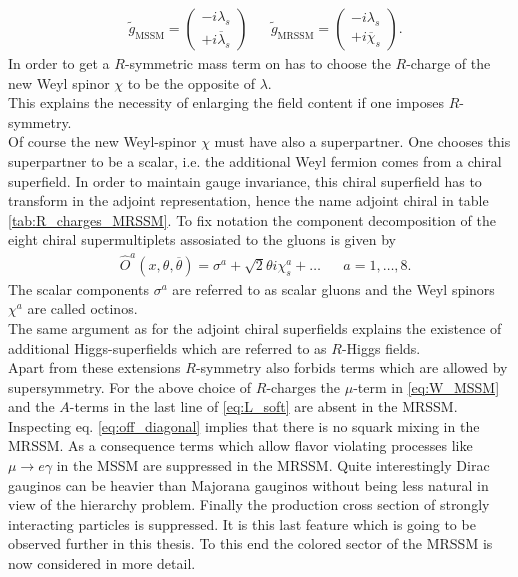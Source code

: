 \begin{align}
& \tilde{g}_\mathrm{MSSM} = \begin{pmatrix}
-i \lambda_s \\
+i \overline{\lambda}_s
\end{pmatrix} && \tilde{g}_\mathrm{MRSSM} = \begin{pmatrix}
-i \lambda_s \\
+i \overline{\chi}_s
\end{pmatrix}.
\end{align}
In order to get a $R$-symmetric mass term on has to choose the $R$-charge of the new Weyl spinor $\chi$ to be the opposite of $\lambda$.\\
This explains the necessity of enlarging the field content if one imposes $R$-symmetry.\\
Of course the new Weyl-spinor $\chi$ must have also a superpartner. One chooses this superpartner to be a scalar, i.e. the additional Weyl fermion comes from a chiral superfield. In order to maintain gauge invariance, this chiral superfield has to transform in the adjoint representation, hence the name adjoint chiral in table \ref{tab:R_charges_MRSSM}. To fix notation the component decomposition of the eight chiral supermultiplets assosiated to the gluons is given by
\begin{align}
&\hat{O}^a(x, \theta, \overline{\theta}) = \sigma^a + \sqrt{2}\theta i\chi^a_s + \hdots && a = 1,\hdots,8.
\end{align}
The scalar components $\sigma^a$ are referred to as scalar gluons and the Weyl spinors $\chi^a$ are called octinos.\\
The same argument as for the adjoint chiral superfields explains the existence of additional Higgs-superfields which are referred to as $R$-Higgs fields.\\
Apart from these extensions $R$-symmetry also forbids terms which are allowed by supersymmetry. For the above choice of $R$-charges the $\mu$-term in \eqref{eq:W_MSSM} and the $A$-terms in the last line of \eqref{eq:L_soft} are absent in the MRSSM. Inspecting eq. \eqref{eq:off_diagonal} implies that there is no squark mixing in the MRSSM. As a consequence terms which allow flavor violating processes like $\mu \to e \gamma$ in the MSSM are suppressed in the MRSSM\cite{Kribs:2007ac}. Quite interestingly Dirac gauginos can be heavier than Majorana gauginos without being less natural in view of the hierarchy problem\cite{Nelson:2002ca, Kribs:2012gx, Hardy:2013ywa}. Finally the production cross section of strongly interacting particles is suppressed\cite{Kribs:2012gx, Kribs:2013oda}. It is this last feature which is going to be observed further in this thesis. To this end the colored sector of the MRSSM is now considered in more detail.


